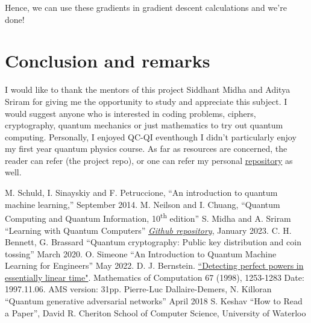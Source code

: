 \documentclass[conference]{IEEEtran}
\begin{document}
Hence, we can use these gradients in gradient descent calculations and we're done!

\section*{Conclusion and remarks}
I would like to thank the mentors of this project Siddhant Midha and Aditya Sriram for giving 
me the opportunity to study and appreciate this subject. I would suggest anyone who is interested in coding problems, ciphers, cryptography, quantum mechanics or just
mathematics to try out quantum computing. Personally, I enjoyed QC-QI eventhough I didn't particularly enjoy my first year quantum physics course. As far as resources are concerned, 
the reader can refer \cite{b3} (the project repo), or one can refer my personal \href{https://github.com/Ihsoj-Mahos/WiDS-QML}{repository} as well. 

\begin{thebibliography}{00}
 M. Schuld, I. Sinayskiy and F. Petruccione, ``An introduction to quantum machine learning,'' September 2014.
 M. Neilson and I. Chuang, ``Quantum Computing and Quantum Information, 10\textsuperscript{th} edition''
 S. Midha and A. Sriram ``Learning with Quantum Computers'' \href{https://github.com/siddhant-midha/WiDS-22-Learning-with-quantum-computers-}{\textit{Github repository}}, January 2023.
 C. H. Bennett, G. Brassard ``Quantum cryptography: Public key distribution and coin tossing'' March 2020.
 O. Simeone ``An Introduction to Quantum Machine Learning for Engineers'' May 2022.
 D. J. Bernstein. \href{http://cr.yp.to/papers/powers-19971106-retypeset20220326.pdf}{``Detecting perfect powers in essentially linear time"}. Mathematics of Computation 67 (1998), 1253-1283 Date: 1997.11.06. AMS version: 31pp.
 Pierre-Luc Dallaire-Demers, N. Killoran ``Quantum generative adversarial networks'' April 2018
 S. Keshav ``How to Read a Paper'', David R. Cheriton School of Computer Science, University of Waterloo
\end{thebibliography}
\vspace{12pt}
\end{document}
